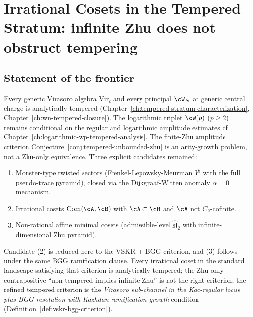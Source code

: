 \chapter{Irrational Cosets in the Tempered Stratum: infinite Zhu does
not obstruct tempering}
\label{ch:irrational-cosets-tempered}

\section*{Statement of the frontier}

Every generic Virasoro algebra $\mathrm{Vir}_c$ and every principal
$\cW_N$ at generic central charge is analytically tempered
(Chapter~\ref{ch:tempered-stratum-characterization},
Chapter~\ref{ch:wn-tempered-closure}). The logarithmic triplet
$\cW(p)$ ($p \ge 2$) remains conditional on the regular and logarithmic
amplitude estimates of
Chapter~\ref{ch:logarithmic-wp-tempered-analysis}. The finite-Zhu
amplitude criterion
Conjecture~\ref{conj:tempered-unbounded-zhu} is an arity-growth
problem, not a Zhu-only equivalence. Three explicit candidates
remained:
\begin{enumerate}[nosep]
\item Monster-type twisted sectors
 (Frenkel-Lepowsky-Meurman $V^\natural$ with the full pseudo-trace
 pyramid), closed via the Dijkgraaf-Witten anomaly $\alpha = 0$
 mechanism.
\item Irrational cosets
 $\mathrm{Com}(\cA, \cB)$ with $\cA \subset \cB$ and $\cA$ not
 $C_2$-cofinite.
\item Non-rational affine minimal cosets
 (admissible-level $\widehat{\mathfrak{sl}}_2$ with
 infinite-dimensional Zhu pyramid).
\end{enumerate}

Candidate (2) is reduced here to the VSKR + BGG criterion, and (3)
follows under the same BGG ramification clause. Every irrational coset
in the standard landscape satisfying that criterion is analytically
tempered; the Zhu-only contrapositive ``non-tempered implies infinite
Zhu'' is not the right criterion; the refined tempered criterion is the
\emph{Virasoro sub-channel in the Kac-regular locus plus BGG
resolution with Kazhdan-ramification growth} condition
(Definition~\ref{def:vskr-bgg-criterion}).

